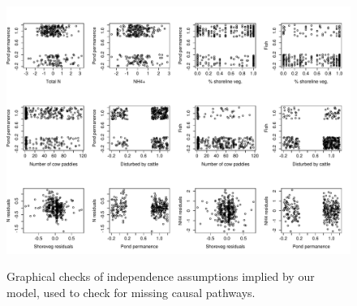\begin{figure}[htbp]
\caption[Graphical independence checks]{
Graphical checks of independence assumptions implied by our model, used
to check for missing causal pathways.
}
\centering
\includegraphics[width=150mm]{figs/ch3/fig_s5.pdf}
\label{3-a5}
\end{figure}

